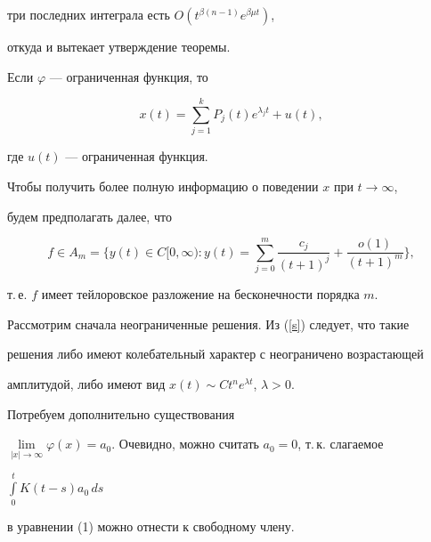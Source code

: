 три последних интеграла есть $O(t^{\beta (n-1)} e^{\beta \mu t})$,


откуда и вытекает утверждение теоремы.





\begin{cornonum}


Если $\varphi$ --- ограниченная функция, то


\begin{equation}\label{s}


x(t)= \sum_{j=1}^k P_j (t) e^{\lambda_j t} +u(t),


\end{equation}


где $u(t)$ --- ограниченная функция.


\end{cornonum}





Чтобы получить более полную информацию о поведении $x$ при $t \to \infty$,


будем предполагать далее, что


$$


f \in A_m = \bigg\{ y(t)\in C[0,\infty): y(t)=\sum_{j=0}^m \frac{c_j}{(t+1)


^j} + \frac{o(1)}{(t+1)^m} \bigg\},


$$


т.\,е. $f$ имеет тейлоровское разложение на бесконечности порядка $m$.





Рассмотрим сначала неограниченные решения. Из (\ref{s}) следует, что такие


решения либо имеют колебательный характер с неограничено возрастающей


амплитудой, либо имеют вид $x(t)\sim Ct^n e^{\lambda t}$, $\lambda>0$.


Потребуем дополнительно существования


$\lim\limits_{|x| \to \infty} \varphi(x)


=a_0$. Очевидно, можно считать $a_0=0$, т.\,к. слагаемое


$\int\limits_0^t K(t-s)a_0\,ds$


в уравнении (1) можно отнести к свободному члену.





